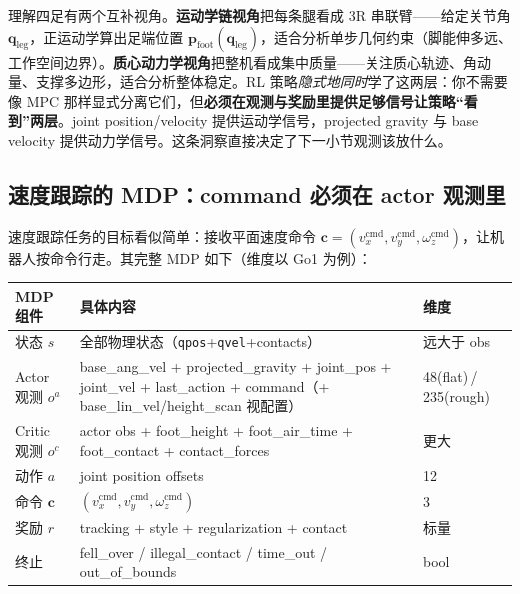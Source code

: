 \begin{insight}[策略隐式地同时做运动学与动力学控制]\label{ins:rlmc-ql-kindyn}
理解四足有两个互补视角。\textbf{运动学链视角}把每条腿看成 3R 串联臂——给定关节角 $\mathbf{q}_{\text{leg}}$，正运动学算出足端位置 $\mathbf{p}_{\text{foot}}(\mathbf{q}_{\text{leg}})$，适合分析单步几何约束（脚能伸多远、工作空间边界）。\textbf{质心动力学视角}把整机看成集中质量——关注质心轨迹、角动量、支撑多边形，适合分析整体稳定。RL 策略\emph{隐式地同时}学了这两层：你不需要像 MPC 那样显式分离它们，但\textbf{必须在观测与奖励里提供足够信号让策略“看到”两层}。joint position/velocity 提供运动学信号，projected gravity 与 base velocity 提供动力学信号。这条洞察直接决定了下一小节观测该放什么。
\end{insight}

\subsection{速度跟踪的 MDP：command 必须在 actor 观测里}
\label{sec:rlmc-ql-mdp-def}

速度跟踪任务的目标看似简单：接收平面速度命令 $\mathbf{c}=(v_x^{\text{cmd}}, v_y^{\text{cmd}}, \omega_z^{\text{cmd}})$，让机器人按命令行走。其完整 MDP 如下（维度以 Go1 为例）：

\begin{center}
\small
\begin{tabularx}{\linewidth}{@{}lLl@{}}
\toprule
MDP 组件 & 具体内容 & 维度 \\
\midrule
状态 $s$ & 全部物理状态（\texttt{qpos}+\texttt{qvel}+contacts） & 远大于 obs \\
Actor 观测 $o^a$ & base\_ang\_vel + projected\_gravity + joint\_pos + joint\_vel + last\_action + command（+ base\_lin\_vel/height\_scan 视配置） & 48(flat)\,/\,235(rough) \\
Critic 观测 $o^c$ & actor obs + foot\_height + foot\_air\_time + foot\_contact + contact\_forces & 更大 \\
动作 $a$ & joint position offsets & 12 \\
命令 $\mathbf{c}$ & $(v_x^{\text{cmd}}, v_y^{\text{cmd}}, \omega_z^{\text{cmd}})$ & 3 \\
奖励 $r$ & tracking + style + regularization + contact & 标量 \\
终止 & fell\_over / illegal\_contact / time\_out / out\_of\_bounds & bool \\
\bottomrule
\end{tabularx}
\end{center}

